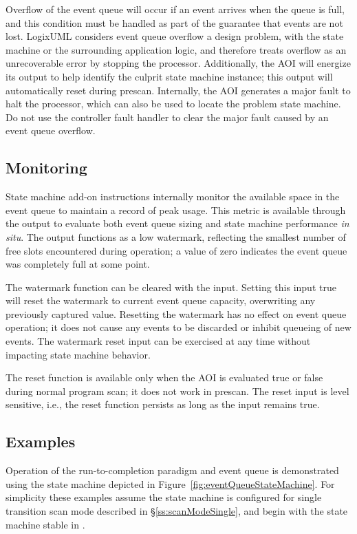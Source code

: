 Overflow of the event queue will occur if an event arrives when the queue
is full, and this condition must be handled as part of the guarantee that
events are not lost.
LogixUML considers event queue overflow a design problem,
with the state machine or the surrounding application logic, and
therefore treats overflow as an unrecoverable error by stopping the processor.
Additionally, the AOI will energize its 
output to help identify the culprit state machine instance; this output
will automatically reset during prescan. Internally, the AOI generates
a major fault to halt the processor, which can also be used to locate the
problem state machine. Do not use the controller fault handler
to clear the major fault caused by an event queue overflow.


\subsection{Monitoring}

State machine add-on instructions internally monitor the available space in
the event queue to maintain a record of peak usage. This metric is
available through the  output
to evaluate both event queue sizing and state machine performance
\emph{in situ}. The output functions as a low
watermark, reflecting the smallest number of free slots encountered during
operation; a value of zero indicates the event queue was completely
full at some point.

The watermark function can be cleared with the
 input. Setting this input true will
reset the watermark to current event queue capacity, overwriting any
previously captured value. Resetting the watermark has no effect on event
queue operation; it does not cause any events to be discarded or inhibit
queueing of new events. The watermark reset input can be exercised at any
time without impacting state machine behavior.

The reset function is available only when the
AOI is evaluated true or false during normal program scan; it does not
work in prescan. The reset input is level sensitive, i.e., the reset
function persists as long as the input remains true.


\subsection{Examples}

Operation of the run-to-completion paradigm and event queue is
demonstrated using the state machine depicted in
Figure~\ref{fig:eventQueueStateMachine}. For simplicity these examples
assume the state machine is configured for single transition scan mode
described in \S\ref{ss:scanModeSingle},
and begin with the state machine stable in .

